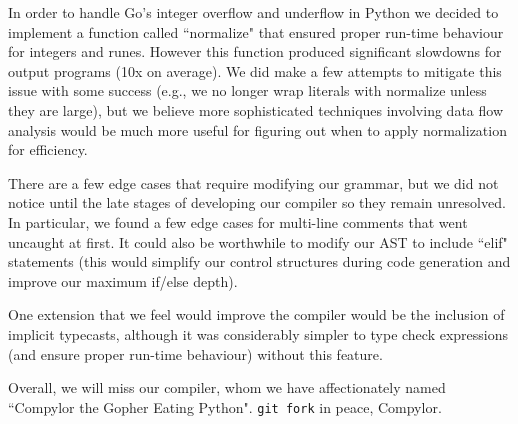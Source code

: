 \documentclass{article}
\begin{document}
In order to handle Go's integer overflow and underflow in Python we decided to implement a function called ``normalize" that ensured proper run-time behaviour for integers and runes. However this function produced significant slowdowns for output programs (10x on average). We did make a few attempts to mitigate this issue with some success (e.g., we no longer wrap literals with normalize unless they are large), but we believe more sophisticated techniques involving data flow analysis would be much more useful for figuring out when to apply normalization for efficiency.

There are a few edge cases that require modifying our grammar, but we did not notice until the late stages of developing our compiler so they remain unresolved. In particular, we found a few edge cases for multi-line comments that went uncaught at first. It could also be worthwhile to modify our AST to include ``elif" statements (this would simplify our control structures during code generation and improve our maximum if/else depth).

One extension that we feel would improve the compiler would be the inclusion of implicit typecasts, although it was considerably simpler to type check expressions (and ensure proper run-time behaviour) without this feature.

Overall, we will miss our compiler, whom we have affectionately named ``Compylor the Gopher Eating Python". \lstinline|git fork| in peace, Compylor.
\end{document}
